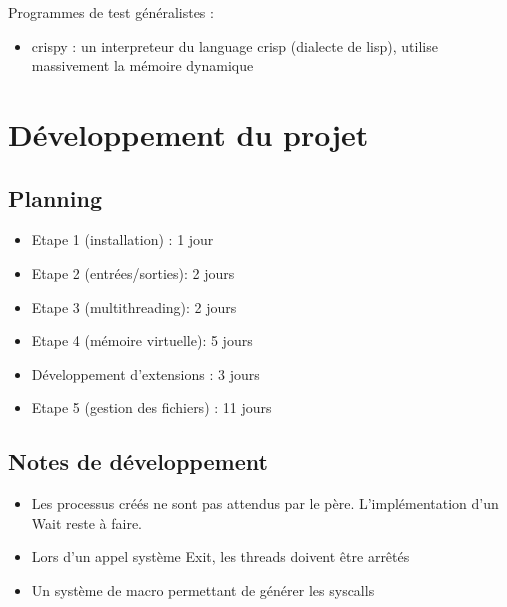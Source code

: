 \documentclass{article}
\begin{document}
Programmes de test généralistes :
\begin{itemize}
\item crispy : un interpreteur du language crisp (dialecte de lisp),
  utilise massivement la mémoire dynamique
\end{itemize}

\section{Développement du projet}

\subsection{Planning}
\begin{itemize}
\item Etape 1 (installation) : 1 jour
\item Etape 2 (entrées/sorties): 2 jours
\item Etape 3 (multithreading): 2 jours
\item Etape 4 (mémoire virtuelle): 5 jours
\item Développement d'extensions : 3 jours
\item Etape 5 (gestion des fichiers) : 11 jours
\end{itemize}
\subsection{Notes de développement}

\begin{itemize}
  \item Les processus créés ne sont pas attendus par le père. L'implémentation d'un Wait reste à faire.
  \item Lors d'un appel système Exit, les threads doivent être arrêtés
  \item Un système de macro permettant de générer les syscalls
\end{itemize}
\end{document}
